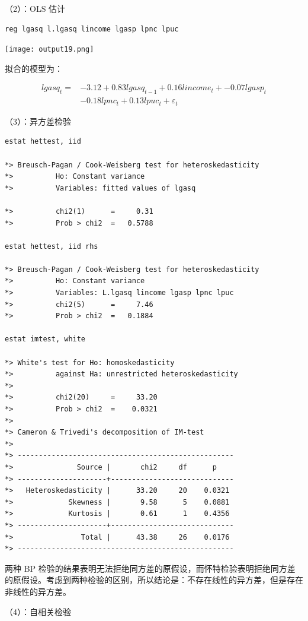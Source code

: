 \documentclass[cn,fancy,blue,11pt]{elegantbook}
\begin{document}
（2）：OLS 估计

\begin{lstlisting}
reg lgasq l.lgasq lincome lgasp lpnc lpuc
\end{lstlisting}

\noindent\texttt{[image: output19.png]}

拟合的模型为：

\begin{align}
lgasq_t =& -3.12 + 0.83 lgasq_{t-1} + 0.16lincome_t + -0.07lgasp_t \\
& - 0.18lpnc_t + 0.13lpuc_t + \varepsilon_t
\end{align}

（3）：异方差检验

\begin{lstlisting}
estat hettest, iid

*> Breusch-Pagan / Cook-Weisberg test for heteroskedasticity
*>          Ho: Constant variance
*>          Variables: fitted values of lgasq

*>          chi2(1)      =     0.31
*>          Prob > chi2  =   0.5788

estat hettest, iid rhs

*> Breusch-Pagan / Cook-Weisberg test for heteroskedasticity
*>          Ho: Constant variance
*>          Variables: L.lgasq lincome lgasp lpnc lpuc
*>          chi2(5)      =     7.46
*>          Prob > chi2  =   0.1884

estat imtest, white

*> White's test for Ho: homoskedasticity
*>          against Ha: unrestricted heteroskedasticity
*>
*>          chi2(20)     =     33.20
*>          Prob > chi2  =    0.0321
*>
*> Cameron & Trivedi's decomposition of IM-test
*>
*> ---------------------------------------------------
*>               Source |       chi2     df      p
*> ---------------------+-----------------------------
*>   Heteroskedasticity |      33.20     20    0.0321
*>             Skewness |       9.58      5    0.0881
*>             Kurtosis |       0.61      1    0.4356
*> ---------------------+-----------------------------
*>                Total |      43.38     26    0.0176
*> ---------------------------------------------------
\end{lstlisting}

两种 BP 检验的结果表明无法拒绝同方差的原假设，而怀特检验表明拒绝同方差的原假设。考虑到两种检验的区别，所以结论是：不存在线性的异方差，但是存在非线性的异方差。

（4）：自相关检验
\end{document}
